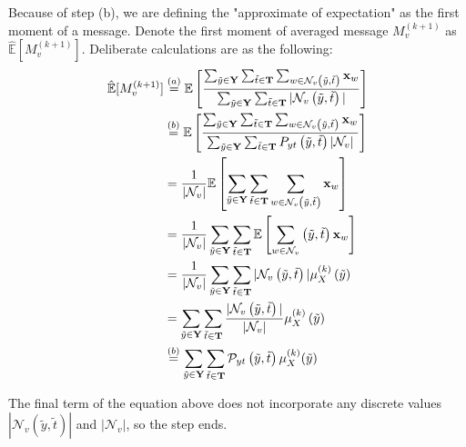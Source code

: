 Because of step (b), we are defining the "approximate of expectation" as the first moment of a message. Denote the first moment of averaged message ${M_{ v}^{(k+1)}}$ as $\hat{\mathbb E}[{M_{ v}^{(k+1)}}]$. Deliberate calculations are as the following:
\begin{align}
    \hat{\mathbb E}[{M_{ v}^{(k+1)}}] &\overset{(a)}{=} {\mathbb E}\left[{\sum_{\tilde{y}\in \bold{Y}}\sum_{\tilde{t}\in\bold{T}}\sum_{w\in\mathcal{N}_{v}\left(\tilde{y}, \tilde{t}\right)}\bold{x}_w \over \sum_{\tilde{y}\in \bold{Y}}\sum_{\tilde{t}\in\bold{T}} |\mathcal{N}_{v}\left(\tilde{y}, \tilde{t}\right)|}\right]\\&\overset{(b)}{=}
    \mathbb{E}\left[{\sum_{\tilde{y}\in \bold{Y}}\sum_{\tilde{t}\in\bold{T}}\sum_{w\in\mathcal{N}_{v}\left(\tilde{y}, \tilde{t}\right)}\bold{x}_w \over \sum_{\tilde{y}\in \bold{Y}}\sum_{\tilde{t}\in\bold{T}} P_{yt}\left(\tilde{y}, \tilde{t}\right)|\mathcal{N}_{v}|}\right]\\&=
    {1 \over |\mathcal{N}_{v}|}\mathbb{E}\left[{\sum_{\tilde{y}\in \bold{Y}}\sum_{\tilde{t}\in\bold{T}}\sum_{w\in\mathcal{N}_{v}\left(\tilde{y}, \tilde{t}\right)}\bold{x}_w}\right]\\&=
    {1 \over |\mathcal{N}_{v}|}\sum_{\tilde{y}\in \bold{Y}}\sum_{\tilde{t}\in\bold{T}}\mathbb{E}\left[\sum_{w\in\mathcal{N}_{v}}\left(\tilde{y}, \tilde{t}\right)\bold{x}_w\right]\\&=
    {1 \over |\mathcal{N}_{v}|}\sum_{\tilde{y}\in \bold{Y}}\sum_{\tilde{t}\in\bold{T}}|\mathcal{N}_{v}\left(\tilde{y}, \tilde{t}\right)|\mu_{X}^{(k)}\left(\tilde{y}\right)\\&=
    \sum_{\tilde{y}\in \bold{Y}}\sum_{\tilde{t}\in\bold{T}}{|\mathcal{N}_{v}\left(\tilde{y}, \tilde{t}\right)| \over |\mathcal{N}_{v}|}\mu_{X}^{(k)}\left(\tilde{y}\right)\\&\overset{(b)}{=}
    \sum_{\tilde{y}\in \bold{Y}}\sum_{\tilde{t}\in\bold{T}}\mathcal{P}_{y t}\left(\tilde{y}, \tilde{t}\right)\mu_{X}^{(k)}(\tilde{y})
\end{align}

The final term of the equation above does not incorporate any discrete values $|\mathcal{N}_{v}\left(\tilde{y}, \tilde{t}\right)|$ and $|\mathcal{N}_{v}|$, so the step ends.

